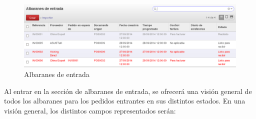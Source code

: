 \begin{figure}[H]
\includegraphics[width=\textwidth]{almacen/img/alb_entrada.png}
\caption{Albaranes de entrada}
\end{figure}

Al entrar en la sección de albaranes de entrada, se ofrecerá una visión general de todos los albaranes para los pedidos entrantes en sus distintos estados. En una visión general, los distintos campos representados serán:

